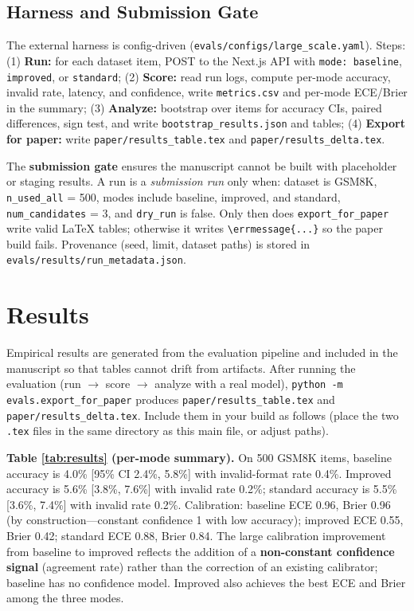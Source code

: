 \documentclass[10pt]{article}
\begin{document}
\subsection{Harness and Submission Gate}
The external harness is config-driven (\texttt{evals/configs/large\_scale.yaml}). Steps: (1) \textbf{Run:} for each dataset item, POST to the Next.js API with \texttt{mode: baseline}, \texttt{improved}, or \texttt{standard}; (2) \textbf{Score:} read run logs, compute per-mode accuracy, invalid rate, latency, and confidence, write \texttt{metrics.csv} and per-mode ECE/Brier in the summary; (3) \textbf{Analyze:} bootstrap over items for accuracy CIs, paired differences, sign test, and write \texttt{bootstrap\_results.json} and tables; (4) \textbf{Export for paper:} write \texttt{paper/results\_table.tex} and \texttt{paper/results\_delta.tex}.

The \textbf{submission gate} ensures the manuscript cannot be built with placeholder or staging results. A run is a \textit{submission run} only when: dataset is GSM8K, \texttt{n\_used\_all} = 500, modes include baseline, improved, and standard, \texttt{num\_candidates} = 3, and \texttt{dry\_run} is false. Only then does \texttt{export\_for\_paper} write valid \LaTeX{} tables; otherwise it writes \texttt{\textbackslash errmessage\{...\}} so the paper build fails. Provenance (seed, limit, dataset paths) is stored in \texttt{evals/results/run\_metadata.json}.

\section{Results}
\label{sec:results}
Empirical results are generated from the evaluation pipeline and included in the manuscript so that tables cannot drift from artifacts. After running the evaluation (run $\to$ score $\to$ analyze with a real model), \texttt{python -m evals.export\_for\_paper} produces \texttt{paper/results\_table.tex} and \texttt{paper/results\_delta.tex}. Include them in your build as follows (place the two \texttt{.tex} files in the same directory as this main file, or adjust paths).




\textbf{Table \ref{tab:results} (per-mode summary).} On 500 GSM8K items, baseline accuracy is 4.0\% [95\% CI 2.4\%, 5.8\%] with invalid-format rate 0.4\%. Improved accuracy is 5.6\% [3.8\%, 7.6\%] with invalid rate 0.2\%; standard accuracy is 5.5\% [3.6\%, 7.4\%] with invalid rate 0.2\%. Calibration: baseline ECE 0.96, Brier 0.96 (by construction---constant confidence 1 with low accuracy); improved ECE 0.55, Brier 0.42; standard ECE 0.88, Brier 0.84. The large calibration improvement from baseline to improved reflects the addition of a \textbf{non-constant confidence signal} (agreement rate) rather than the correction of an existing calibrator; baseline has no confidence model. Improved also achieves the best ECE and Brier among the three modes.
\end{document}
